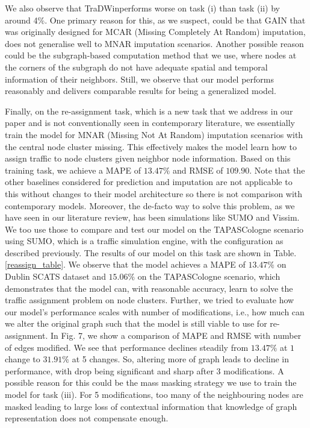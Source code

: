 \documentclass[conference]{IEEEtran}
\newcommand{\name}{TraDWin}
\begin{document}
We also observe that \name performs worse on task (i) than task (ii) by around 4\%. One primary reason for this, as we suspect, could be that GAIN that was originally designed for MCAR (Missing Completely At Random) imputation, does not generalise well to MNAR imputation scenarios. Another possible reason could be the subgraph-based computation method that we use, where nodes at the corners of the subgraph do not have adequate spatial and temporal information of their neighbors. Still, we observe that our model performs reasonably and delivers comparable results for being a generalized model.

Finally, on the re-assignment task, which is a new task that we address in our paper and is not conventionally seen in contemporary literature, we essentially train the model for MNAR (Missing Not At Random) imputation scenarios with the central node cluster missing. This effectively makes the model learn how to assign traffic to node clusters given neighbor node information. Based on this training task, we achieve a MAPE of $13.47\%$ and RMSE of $109.90$. Note that the other baselines considered for prediction and imputation are not applicable to this without changes to their model architecture so there is not comparison with contemporary models. Moreover, the de-facto way to solve this problem, as we have seen in our literature review, has been simulations like SUMO\cite{sumo} and Vissim\cite{vissim}. We too use those to compare and test our model on the TAPASCologne scenario using SUMO, which is a traffic simulation engine, with the configuration as described previously. The results of our model on this task are shown in Table. \ref{reassign_table}. We observe that the model achieves a MAPE of $13.47\%$ on Dublin SCATS dataset and $15.06\%$ on the TAPASCologne scenario, which demonstrates that the model can, with reasonable accuracy, learn to solve the traffic assignment problem on node clusters. Further, we tried to evaluate how our model's performance scales with number of modifications, i.e., how much can we alter the original graph such that the model is still viable to use for re-assignment. In Fig. 7, we show a comparison of MAPE and RMSE with number of edges modified. We see that performance declines steadily from $13.47\%$ at $1$ change to $31.91\%$ at 5 changes. So, altering more of graph leads to decline in performance, with drop being significant and sharp after $3$ modifications. A possible reason for this could be the mass masking strategy we use to train the model for task (iii). For 5 modifications, too many of the neighbouring nodes are masked leading to large loss of contextual information that knowledge of graph representation does not compensate enough. 
\end{document}
